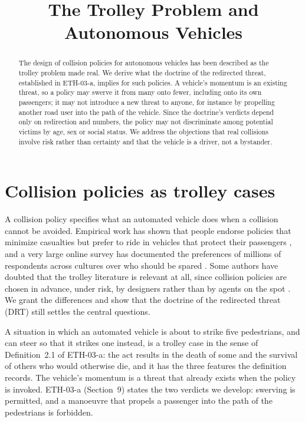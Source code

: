 \documentclass{situationist-preprint}
\title{The Trolley Problem and Autonomous Vehicles}
\begin{document}
\maketitle

\begin{abstract}
The design of collision policies for autonomous vehicles has been described as the trolley problem made real. We derive what the doctrine of the redirected threat, established in ETH-03-a, implies for such policies. A vehicle's momentum is an existing threat, so a policy may swerve it from many onto fewer, including onto its own passengers; it may not introduce a new threat to anyone, for instance by propelling another road user into the path of the vehicle. Since the doctrine's verdicts depend only on redirection and numbers, the policy may not discriminate among potential victims by age, sex or social status. We address the objections that real collisions involve risk rather than certainty and that the vehicle is a driver, not a bystander.
\end{abstract}

\section{Collision policies as trolley cases}

A collision policy specifies what an automated vehicle does when a collision cannot be avoided. Empirical work has shown that people endorse policies that minimize casualties but prefer to ride in vehicles that protect their passengers \citep{Bonnefon2016}, and a very large online survey has documented the preferences of millions of respondents across cultures over who should be spared \citep{Awad2018}. Some authors have doubted that the trolley literature is relevant at all, since collision policies are chosen in advance, under risk, by designers rather than by agents on the spot \citep{Nyholm2016}. We grant the differences and show that the doctrine of the redirected threat (DRT) still settles the central questions.

A situation in which an automated vehicle is about to strike five pedestrians, and can steer so that it strikes one instead, is a trolley case in the sense of Definition~2.1 of ETH-03-a: the act results in the death of some and the survival of others who would otherwise die, and it has the three features the definition records. The vehicle's momentum is a threat that already exists when the policy is invoked. ETH-03-a (Section~9) states the two verdicts we develop: swerving is permitted, and a manoeuvre that propels a passenger into the path of the pedestrians is forbidden.
\end{document}
